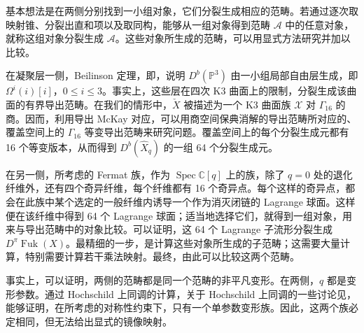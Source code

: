 基本想法是在两侧分别找到一小组对象，它们分裂生成相应的范畴。若通过逐次取映射锥、分裂出直和项以及取同构，能够从一组对象得到范畴 $\mathcal A$ 中的任意对象，就称这组对象分裂生成 $\mathcal A$。这些对象所生成的范畴，可以用显式方法研究并加以比较。

在凝聚层一侧，Beilinson 定理，即，说明 $D^b(\mathbb P^3)$ 由一小组局部自由层生成，即 $\Omega^i(i)[i]$，$0\leq i\leq3$。事实上，这些层在四次 K3 曲面上的限制，分裂生成该曲面的有界导出范畴。在我们的情形中，$\check X$ 被描述为一个 K3 曲面族 $\mathcal X$ 对 $\Gamma_{16}$ 的商。因而，利用导出 McKay 对应，可以用商空间保典消解的导出范畴所对应的、覆盖空间上的 $\Gamma_{16}$ 等变导出范畴来研究问题。覆盖空间上的每个分裂生成元都有 16 个等变版本，从而得到 $D^b(\widehat X_q)$ 的一组 64 个分裂生成元。

在另一侧，所考虑的 Fermat 族，作为 $\operatorname{Spec}\mathbb C[q]$ 上的族，除了 $q=0$ 处的退化纤维外，还有四个奇异纤维，每个纤维都有 16 个奇异点。每个这样的奇异点，都会在此族中某个选定的一般纤维内诱导一个作为消灭闭链的 Lagrange 球面。这样便在该纤维中得到 64 个 Lagrange 球面；适当地选择它们，就得到一组对象，用来与导出范畴中的对象比较。可以证明，这 64 个 Lagrange 子流形分裂生成 $D^\pi\operatorname{Fuk}(X)$。最精细的一步，是计算这些对象所生成的子范畴；这需要大量计算，特别需要计算若干乘法映射。最终，由此可以比较这两个范畴。

事实上，可以证明，两侧的范畴都是同一个范畴的非平凡变形。在两侧，$q$ 都是变形参数。通过 Hochschild 上同调的计算，关于 Hochschild 上同调的一些讨论见，能够证明，在所考虑的对称性约束下，只有一个单参数变形族。因此，这两个族必定相同，但无法给出显式的镜像映射。

